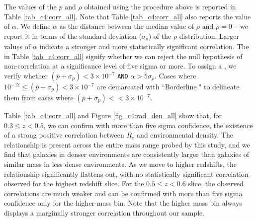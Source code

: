 The values of the $p$ and $\rho$ obtained using the procedure above is reported in Table \ref{tab_c4:corr_all}. Note that Table \ref{tab_c4:corr_all} also reports the value of $\alpha$. We define $\alpha$ as the distance between the median value of $\rho$ and $\rho=0$ -- we report it in terms of the standard deviation ($\sigma_{\rho}$) of the $\rho$ distribution. Larger values of $\alpha$ indicate a stronger and more statistically significant correlation. The  in Table \ref{tab_c4:corr_all} signify whether we can reject the null hypothesis of non-correlation at a significance level of five sigma or more. To assign a \checkmark, we verify whether $(\overline{p} + \sigma_p) < 3\times10^{-7} $ \texttt{AND} $\alpha>5\sigma_{\rho}$. Cases where $10^{-12} \leq (\overline{p} + \sigma_p) < 3\times10^{-7} $ are demarcated with ``Borderline \checkmark" to delineate them from cases where $(\overline{p} + \sigma_p) << 3\times10^{-7}$.

Table \ref{tab_c4:corr_all} and Figure \ref{fig_c4:rad_den_all} show that, for $0.3 \leq z < 0.5$, we can confirm with more than five sigma confidence, the existence of a strong positive correlation between $R_e$ and environmental density. The relationship is present across the entire mass range probed by this study, and we find that galaxies in denser environments are consistently larger than galaxies of similar mass in less dense environments. As we move to higher redshifts, the relationship significantly flattens out, with no statistically significant correlation observed for the highest redshift slice. For the $0.5 \leq z < 0.6$ slice, the observed correlations are much weaker and can be confirmed with more than five sigma confidence only for the higher-mass bin. Note that the higher mass bin always displays a marginally stronger correlation throughout our sample. 

